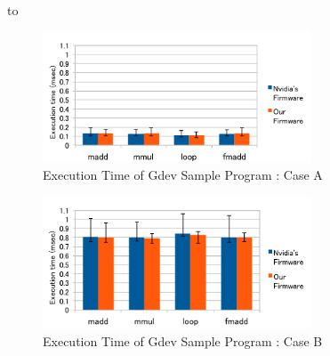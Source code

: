 \begin{table}[!t]
 \caption{Evaluate Environment} 
 \label{tab:environment}
 \hbox to
\end{table}

\begin{figure}
\begin{center}
\hfil
\includegraphics[width=8cm]{./img/good_case.pdf}
\end{center}
\caption{Execution Time of Gdev Sample Program : Case A}
\label{fig:goodcase}
\end{figure}

\begin{figure}
\begin{center}
\includegraphics[width=8cm]{./img/bad_case.pdf}
\end{center}
\caption{Execution Time of Gdev Sample Program : Case B}
\label{fig:badcase}
\end{figure}



